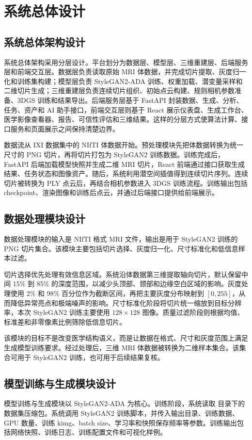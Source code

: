 \chapter{系统总体设计}

\section{系统总体架构设计}
系统总体架构采用分层设计。平台划分为数据层、模型层、三维重建层、后端服务层和前端交互层。数据层负责读取原始 MRI 体数据，并完成切片提取、灰度归一化和训练集构建；模型层负责 StyleGAN2-ADA 训练、权重加载、潜变量采样和二维切片生成；三维重建层负责连续切片组织、初始点云构建、规则相机参数准备、3DGS 训练和结果导出。后端服务层基于 FastAPI 封装数据、生成、分析、任务、资产和 AI 助手接口，前端交互层则基于 React 展示仪表盘、生成工作台、医学影像查看器、报告、可信性评估和三维结果。这样的分层方式使算法计算、接口服务和页面展示之间保持清楚边界。

数据流从 IXI 数据集中的 NIfTI 体数据开始。预处理模块先把体数据转换为统一尺寸的 PNG 切片，再将切片打包为 StyleGAN2 训练数据。训练完成后，FastAPI 后端加载模型快照并生成二维 MRI 切片，React 前端通过接口获取生成结果、任务状态和图像资产。随后，系统利用潜空间插值得到连续切片序列。连续切片被转换为 PLY 点云后，再结合相机参数进入 3DGS 训练流程。训练输出包括 checkpoint、渲染图像和训练后点云，并通过后端接口提供给前端展示。

\section{数据处理模块设计}
数据处理模块的输入是 NIfTI 格式 MRI 文件，输出是用于 StyleGAN2 训练的 PNG 切片集合。该模块主要包括切片选择、灰度归一化、尺寸标准化和低信息样本过滤。

切片选择优先处理有效信息区域。系统沿体数据第三维提取轴向切片，默认保留中间 15\% 到 85\% 的深度范围，以减少头顶部、颈部和边缘空白区域的影响。灰度处理使用 2\% 和 98\% 百分位作为截断区间，再把主要灰度分布映射到 $[0,255]$，从而降低异常亮点和极端噪声的影响。尺寸标准化阶段将切片统一缩放到目标分辨率，本次 StyleGAN2 训练主要使用 $128\times128$ 图像。质量过滤阶段则根据均值、标准差和非零像素比例筛除低信息切片。

该模块的目标不是改变医学结构语义，而是让数据在格式、尺寸和灰度范围上满足生成模型训练要求。经过处理后，三维 MRI 体数据被转换为二维样本集合。该集合可用于 StyleGAN2 训练，也可用于后续结果复核。

\section{模型训练与生成模块设计}
模型训练与生成模块以 StyleGAN2-ADA 为核心。训练阶段，系统读取  目录下的数据集压缩包。系统调用 StyleGAN2 训练脚本，并传入输出目录、训练数据、GPU 数量、训练 kimg、batch size、学习率和快照保存频率等参数。训练输出包括网络快照、训练日志、训练配置文件和可视化样例。

